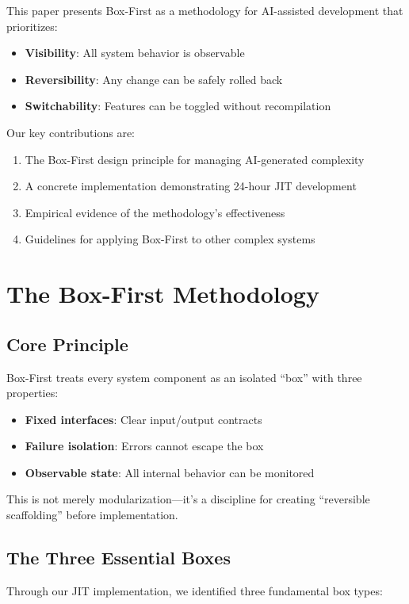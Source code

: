 \documentclass[10pt,conference]{IEEEtran}
\begin{document}
This paper presents Box-First as a methodology for AI-assisted development that prioritizes:
\begin{itemize}
\item \textbf{Visibility}: All system behavior is observable
\item \textbf{Reversibility}: Any change can be safely rolled back
\item \textbf{Switchability}: Features can be toggled without recompilation
\end{itemize}

Our key contributions are:
\begin{enumerate}
\item The Box-First design principle for managing AI-generated complexity
\item A concrete implementation demonstrating 24-hour JIT development
\item Empirical evidence of the methodology's effectiveness
\item Guidelines for applying Box-First to other complex systems
\end{enumerate}

\section{The Box-First Methodology}

\subsection{Core Principle}

Box-First treats every system component as an isolated ``box'' with three properties:
\begin{itemize}
\item \textbf{Fixed interfaces}: Clear input/output contracts
\item \textbf{Failure isolation}: Errors cannot escape the box
\item \textbf{Observable state}: All internal behavior can be monitored
\end{itemize}

This is not merely modularization---it's a discipline for creating ``reversible scaffolding'' before implementation.

\subsection{The Three Essential Boxes}

Through our JIT implementation, we identified three fundamental box types:
\end{document}
